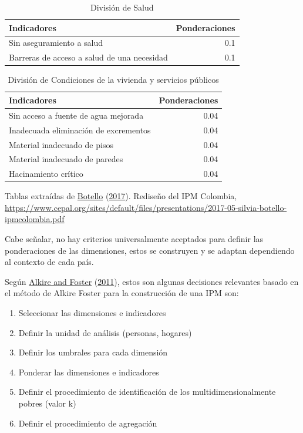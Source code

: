 \documentclass[
  11pt,
]{book}
\providecommand{\tightlist}{%
  \setlength{\itemsep}{0pt}\setlength{\parskip}{0pt}}
\begin{document}
\begin{table}

\caption{\label{tab:unnamed-chunk-14}División de Salud }
\centering
\begin{tabular}[t]{l|r}
\hline
Indicadores  & Ponderaciones\\
\hline
Sin aseguramiento a salud & 0.1\\
\hline
Barreras de acceso a salud de una necesidad & 0.1\\
\hline
\end{tabular}
\end{table}

\begin{table}

\caption{\label{tab:unnamed-chunk-15}División de Condiciones de la vivienda y servicios públicos}
\centering
\begin{tabular}[t]{l|r}
\hline
Indicadores  & Ponderaciones\\
\hline
Sin acceso a fuente de agua mejorada & 0.04\\
\hline
Inadecuada eliminación de excrementos & 0.04\\
\hline
Material inadecuado de pisos & 0.04\\
\hline
Material inadecuado de paredes & 0.04\\
\hline
Hacinamiento crítico & 0.04\\
\hline
\end{tabular}
\end{table}

Tablas extraídas de \protect\hyperlink{ref-botello2017avances}{Botello} (\protect\hyperlink{ref-botello2017avances}{2017}). Rediseño del IPM Colombia, \url{https://www.cepal.org/sites/default/files/presentations/2017-05-silvia-botello-ipmcolombia.pdf}

Cabe señalar, no hay criterios universalmente aceptados para definir las ponderaciones de las dimensiones, estos se construyen y se adaptan dependiendo al contexto de cada país.

Según \protect\hyperlink{ref-alkire2011counting}{Alkire and Foster} (\protect\hyperlink{ref-alkire2011counting}{2011}), estos son algunas decisiones relevantes basado en el método de Alkire Foster para la construcción de una IPM son:

\begin{enumerate}
\def\labelenumi{\arabic{enumi}.}
\tightlist
\item
  Seleccionar las dimensiones e indicadores
\item
  Definir la unidad de análisis (personas, hogares)
\item
  Definir los umbrales para cada dimensión
\item
  Ponderar las dimensiones e indicadores
\item
  Definir el procedimiento de identificación de los multidimensionalmente pobres (valor k)
\item
  Definir el procedimiento de agregación
\end{enumerate}
\end{document}
